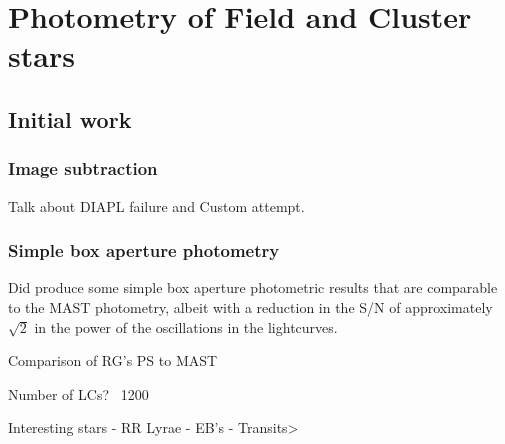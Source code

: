 \chapter{\Kepler Photometry of Field and Cluster stars}

\section{Initial work}
\subsection{Image subtraction}
Talk about DIAPL failure and Custom attempt.

\subsection{Simple box aperture photometry}
Did produce some simple box aperture photometric results that are comparable to the MAST photometry, albeit with a reduction in the S/N of approximately $\sqrt2$ in the power of the oscillations in the lightcurves.

Comparison of RG's PS to MAST

Number of LCs? ~1200

Interesting stars
- RR Lyrae
- EB's
- Transits>
